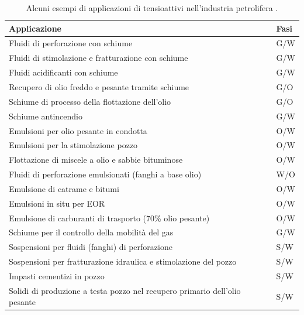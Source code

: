 \begin{table}[htbp]
    \small
    \centering
    \caption{Alcuni esempi di applicazioni di tensioattivi nell'industria petrolifera \parencite{schramm2006emulsions}.}
    \label{tab:surfactantapplications}
\begin{tabular}{p{}p{}}
\hline
{\bf Applicazione}                                                         & {\textbf{Fasi}}           \\ \hline
Fluidi di perforazione con schiume                                         & G/W                    \\
Fluidi di stimolazione e fratturazione con schiume                         & G/W                    \\
Fluidi acidificanti con schiume                                            & G/W                    \\
Recupero di olio freddo e pesante tramite schiume                          & G/O                    \\
Schiume di processo della flottazione dell'olio                            & G/O                    \\
Schiume antincendio                                                        & G/W                    \\
Emulsioni per olio pesante in condotta                                     & O/W                    \\
Emulsioni per la stimolazione pozzo                                        & O/W                    \\
Flottazione di miscele a olio e sabbie bituminose                          & O/W                    \\
Fluidi di perforazione emulsionati (fanghi a base olio)                    & W/O                    \\
Emulsione di catrame e bitumi                                              & O/W                    \\
Emulsioni in situ per EOR                                                  & O/W                    \\
Emulsione di carburanti di trasporto (70\% olio pesante)                   & O/W                    \\
Schiume per il controllo della mobilità del gas                            & G/W                    \\
Sospensioni per fluidi (fanghi) di perforazione                            & S/W                    \\
Sospensioni per fratturazione idraulica e stimolazione del pozzo           & S/W                    \\
Impasti cementizi in pozzo                                                 & S/W                    \\
Solidi di produzione a testa pozzo nel recupero primario dell'olio pesante & S/W                    \\ \hline
\end{tabular}
\end{table}

